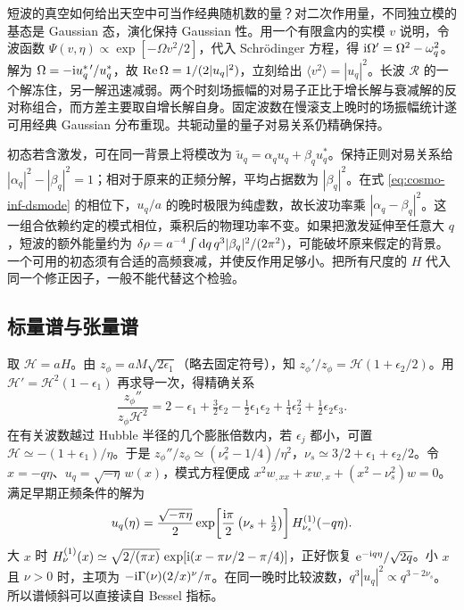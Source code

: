 短波的真空如何给出天空中可当作经典随机数的量？对二次作用量，不同独立模的基态是 Gaussian 态，演化保持 Gaussian 性。用一个有限盒内的实模 $v$ 说明，令波函数 $\Psi(v,\eta)\propto\exp[-\Omega v^2/2]$，代入 Schrödinger 方程，得 $\mathrm{i}\Omega'=\Omega^2-\omega_q^2$。解为 $\Omega=-\mathrm{i} u_q^{*\,\prime}/u_q^*$，故 $\mathop{\rm Re}\Omega=1/(2|u_q|^2)$，立刻给出 $\langle v^2\rangle=|u_q|^2$。长波 $\mathcal R$ 的一个解冻住，另一解迅速减弱。两个时刻场振幅的对易子正比于增长解与衰减解的反对称组合，而方差主要取自增长解自身。固定波数在慢滚支上晚时的场振幅统计遂可用经典 Gaussian 分布重现。共轭动量的量子对易关系仍精确保持。

初态若含激发，可在同一背景上将模改为 $\widetilde u_q=\alpha_q u_q+\beta_q u_q^*$。保持正则对易关系给 $|\alpha_q|^2-|\beta_q|^2=1$；相对于原来的正频分解，平均占据数为 $|\beta_q|^2$。在式 \eqref{eq:cosmo-inf-dsmode} 的相位下，$u_q/a$ 的晚时极限为纯虚数，故长波功率乘 $|\alpha_q-\beta_q|^2$。这一组合依赖约定的模式相位，乘积后的物理功率不变。如果把激发延伸至任意大 $q$，短波的额外能量约为 $\delta\rho=a^{-4}\int \dd q\,q^3|\beta_q|^2/(2\pi^2)$，可能破坏原来假定的背景。一个可用的初态须有合适的高频衰减，并使反作用足够小。把所有尺度的 $H$ 代入同一个修正因子，一般不能代替这个检验。

\subsection{标量谱与张量谱}\label{sec:cosmo-inf-spectra}

取 $\mathcal H=aH$。由 $z_\phi=aM\sqrt{2\epsilon_1}$（略去固定符号），知 $z_\phi'/z_\phi=\mathcal H(1+\epsilon_2/2)$。用 $\mathcal H'=\mathcal H^2(1-\epsilon_1)$ 再求导一次，得精确关系
\begin{equation}\label{eq:cosmo-inf-pump}
 \frac{z_\phi''}{z_\phi\mathcal H^2}
 =2-\epsilon_1+\tfrac32\epsilon_2-\tfrac12\epsilon_1\epsilon_2
  +\tfrac14\epsilon_2^2+\tfrac12\epsilon_2\epsilon_3 .
\end{equation}
在有关波数越过 Hubble 半径的几个膨胀倍数内，若 $\epsilon_j$ 都小，可置 $\mathcal H\simeq-(1+\epsilon_1)/\eta$。于是 $z_\phi''/z_\phi\simeq(\nu_s^2-1/4)/\eta^2$，$\nu_s\simeq3/2+\epsilon_1+\epsilon_2/2$。令 $x=-q\eta$、$u_q=\sqrt{-\eta}\,w(x)$，模式方程便成 $x^2w_{,xx}+xw_{,x}+(x^2-\nu_s^2)w=0$。满足早期正频条件的解为
\begin{equation}\label{eq:cosmo-inf-hankel}
 u_q(\eta)=\frac{\sqrt{-\pi\eta}}2
 \exp\!\left[\frac{\mathrm{i}\pi}{2}\left(\nu_s+\tfrac12\right)\right]
 H^{(1)}_{\nu_s}(-q\eta).
\end{equation}
大 $x$ 时 $H^{(1)}_\nu(x)\simeq\sqrt{2/(\pi x)}\,\exp[\mathrm{i}(x-\pi\nu/2-\pi/4)]$，正好恢复 $\mathrm{e}^{-\mathrm{i} q\eta}/\sqrt{2q}$。小 $x$ 且 $\nu>0$ 时，主项为 $-\mathrm{i}\Gamma(\nu)(2/x)^\nu/\pi$。在同一晚时比较波数，$q^3|u_q|^2\propto q^{3-2\nu_s}$。所以谱倾斜可以直接读自 Bessel 指标。

